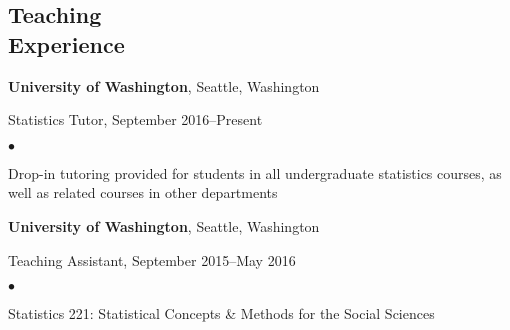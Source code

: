 \documentclass[margin,centered]{res}
\newenvironment{list1}{
  \begin{list}{\ding{113}}{%
      \setlength{\itemsep}{0in}
      \setlength{\parsep}{0in} \setlength{\parskip}{0in}
      \setlength{\topsep}{0in} \setlength{\partopsep}{0in}
      \setlength{\leftmargin}{0.17in}}}{\end{list}}
\newenvironment{list2}{
  \begin{list}{$\bullet$}{%
      \setlength{\itemsep}{0in}
      \setlength{\parsep}{0in} \setlength{\parskip}{0in}
      \setlength{\topsep}{0in} \setlength{\partopsep}{0in}
      \setlength{\leftmargin}{0.2in}}}{\end{list}}
\begin{document}
\begin{resume}
\begin{comment}
{\bf MN2020}, St. Paul, Minnesota
\begin{list1}
\item[] 
Education Research Fellow, January 2013--February 2013
\begin{list2}
\vspace*{.05in}
\item Analyzed local, state, and national education policy through the lens of racial and socioeconomic equity
\item Composed reports evaluating current policy and advocating for policy change
\item Published policy reports to various social media outlets with over 47,000 subscribers
\item Gathered and cleaned data for project to evaluate charter school funding and outcomes
\end{list2}
\end{list1}
\end{comment}

\section{\sc Teaching \\ Experience}

{\bf University of Washington}, Seattle, Washington
\begin{list1}
\item[] Statistics Tutor, September 2016--Present
\begin{list2}
\vspace*{.05in}
\item Drop-in tutoring provided for students in all undergraduate statistics courses, as well as related courses in other departments
\end{list2}
\end{list1}

{\bf University of Washington}, Seattle, Washington
\begin{list1}
\item[] Teaching Assistant, September 2015--May 2016
\begin{list2}
\vspace*{.05in}
\item Statistics 221: Statistical Concepts \& Methods for the Social Sciences
\end{list2}
\end{list1}



\end{resume}
\end{document}
